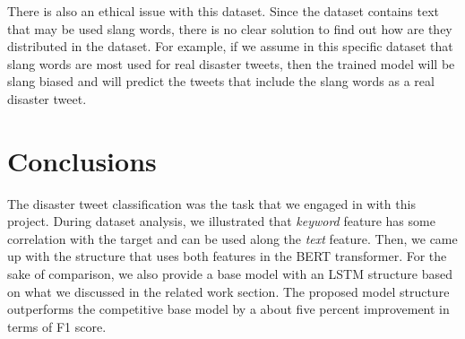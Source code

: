 \documentclass[sigconf]{acmart}
\begin{document}
There is also an ethical issue with this dataset. Since the dataset contains text that may be used slang words, there is no clear solution to find out how are they distributed in the dataset. For example, if we assume in this specific dataset that slang words are most used for real disaster tweets, then the trained model will be slang biased and will predict the tweets that include the slang words as a real disaster tweet.


\section{Conclusions}
The disaster tweet classification was the task that we engaged in with this project. During dataset analysis, we illustrated that \textit{keyword} feature has some correlation with the target and can be used along the \textit{text} feature. Then, we came up with the structure that uses both features in the BERT transformer. For the sake of comparison, we also provide a base model with an LSTM structure based on what we discussed in the related work section. The proposed model structure outperforms the competitive base model by a about five percent improvement in terms of F1 score. 







\end{document}
